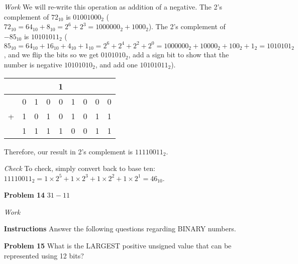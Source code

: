 \documentclass[12pt]{article}
\begin{document}
\begin{enumerate}
  \item[\textit{Work}] We will re-write this operation as addition of a negative. The 2's complement of $72_{10}$ is $01001000_2$ ($72_{10}=64_{10}+8_{10}=2^6+2^3=1000000_2+1000_2$). The 2's complement of $-85_{10}$ is $10101011_2$ ($85_{10}=64_{10}+16_{10}+4_{10}+1_{10}=2^6+2^4+2^2+2^0=1000000_2+10000_2+100_2+1_2=1010101_2$, and we flip the bits so we get $0101010_2$, add a sign bit to show that the number is negative $10101010_2$, and add one $10101011_2$).
  \item[]
  \begin{center}
    \begin{tabular}{c@{\,}c@{\,}c@{\,}c@{\,}c@{\,}c@{\,}c@{\,}c@{\,}c}
      &   &   &   & 1 &   &   &   &   \\    \hline
      & 0 & 1 & 0 & 0 & 1 & 0 & 0 & 0 \\
    + & 1 & 0 & 1 & 0 & 1 & 0 & 1 & 1 \\    \hline
      & 1 & 1 & 1 & 1 & 0 & 0 & 1 & 1
    \end{tabular}
  \end{center}
  \item[] Therefore, our result in 2's complement is $11110011_2$.
  \item[\textit{Check}] To check, simply convert back to base ten: $11110011_2 = 1\times2^5+1\times2^3+1\times2^2+1\times2^1=46_{10}$.
\end{enumerate}


\begin{enumerate}
  \item[\textbf{Problem 14}] $31-11$
\end{enumerate}

\begin{enumerate}
  \item[\textit{Work}]
\end{enumerate}

\begin{enumerate}
  \item[\textbf{Instructions}] Answer the following questions regarding BINARY numbers.
\end{enumerate}

\begin{enumerate}
  \item[\textbf{Problem 15}] What is the LARGEST positive unsigned value that can be represented using 12 bits?
\end{enumerate}
\end{document}
